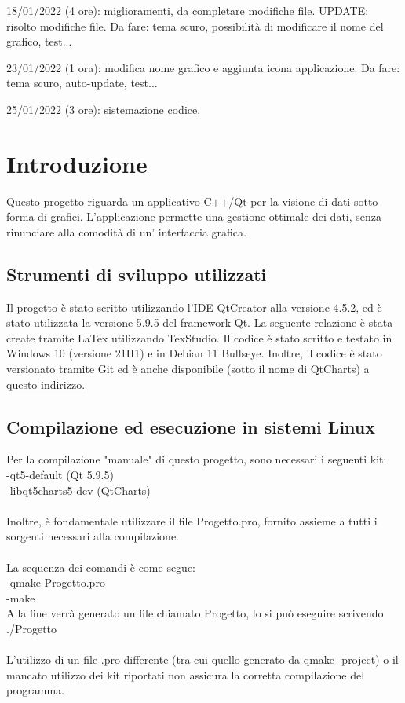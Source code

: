 \documentclass[10pt]{article}
\begin{document}
    18/01/2022 (4 ore): miglioramenti, da completare modifiche file. UPDATE: risolto modifiche file. Da fare: tema scuro, possibilità di modificare il nome del grafico, test...
    
    23/01/2022 (1 ora): modifica nome grafico e aggiunta icona applicazione. Da fare: tema scuro, auto-update, test...
    
    25/01/2022 (3 ore): sistemazione codice.
    
    \newpage
    \tableofcontents
    \newpage
    \section{Introduzione}
     Questo progetto riguarda un applicativo C++/Qt per la visione di dati sotto forma di grafici. L'applicazione permette una gestione ottimale dei dati, senza rinunciare alla comodità di un' interfaccia grafica.
    \subsection{Strumenti di sviluppo utilizzati}
    Il progetto è stato scritto utilizzando l'IDE QtCreator alla versione 4.5.2, ed è stato utilizzata la versione 5.9.5 del framework Qt. 
    La seguente relazione è stata create tramite LaTex utilizzando TexStudio.
    Il codice è stato scritto e testato in Windows 10 (versione 21H1) e in Debian 11 Bullseye.
    Inoltre, il codice è stato versionato tramite Git ed è anche disponibile (sotto il nome di QtCharts) a \href{https://github.com/nicolabaesso/qtCharts}{questo indirizzo}.
    \subsection{Compilazione ed esecuzione in sistemi Linux}
    Per la compilazione "manuale" di questo progetto, sono necessari i seguenti kit:\\
    -qt5-default (Qt 5.9.5)\\
    -libqt5charts5-dev (QtCharts)
    \\
    \\
    Inoltre, è fondamentale utilizzare il file Progetto.pro, fornito assieme a tutti i sorgenti necessari alla compilazione.\\
    \\
    La sequenza dei comandi è come segue:\\
    -qmake Progetto.pro\\
    -make
    \\
    Alla fine verrà generato un file chiamato Progetto, lo si può eseguire scrivendo ./Progetto\\\\
    L'utilizzo di un file .pro differente (tra cui quello generato da qmake -project) o il mancato utilizzo dei kit riportati non assicura la corretta compilazione del programma.
\end{document}
